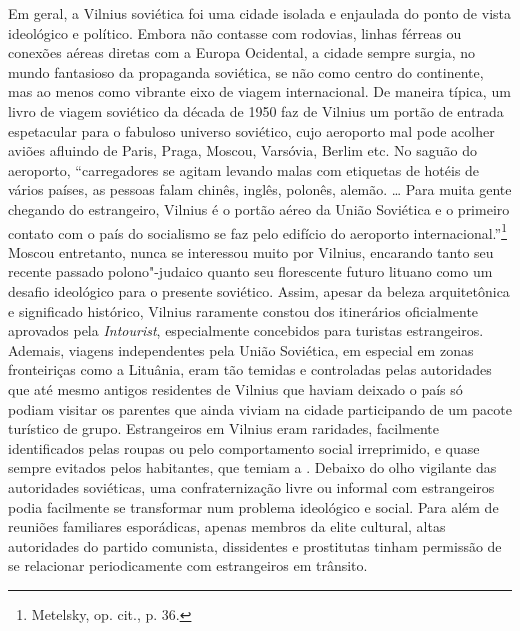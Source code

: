 Em geral, a Vilnius soviética foi uma cidade isolada e enjaulada do
ponto de vista ideológico e político. Embora não contasse com rodovias,
linhas férreas ou conexões aéreas diretas com a Europa Ocidental, a
cidade sempre surgia, no mundo fantasioso da propaganda soviética, se
não como centro do continente, mas ao menos como vibrante eixo de viagem
internacional. De maneira típica, um livro de viagem soviético da década
de 1950 faz de Vilnius um portão de entrada espetacular para o fabuloso
universo soviético, cujo aeroporto mal pode acolher aviões afluindo de
Paris, Praga, Moscou, Varsóvia, Berlim etc. No saguão do aeroporto,
``carregadores se agitam levando malas com etiquetas de hotéis de vários
países, as pessoas falam chinês, inglês, polonês, alemão. \ldots{} Para
muita gente chegando do estrangeiro, Vilnius é o portão aéreo da União
Soviética e o primeiro contato com o país do socialismo se faz pelo
edifício do aeroporto internacional.''\footnote{Metelsky, op. cit., p.
  36.} Moscou entretanto, nunca se interessou muito por Vilnius,
encarando tanto seu recente passado polono"-judaico quanto seu
florescente futuro lituano como um desafio ideológico para o presente
soviético. Assim, apesar da beleza arquitetônica e significado
histórico, Vilnius raramente constou dos itinerários oficialmente
aprovados pela \emph{Intourist}, especialmente concebidos para turistas
estrangeiros. Ademais, viagens independentes pela União Soviética, em
especial em zonas fronteiriças como a Lituânia, eram tão temidas e
controladas pelas autoridades que até mesmo antigos residentes de
Vilnius que haviam deixado o país só podiam visitar os parentes que
ainda viviam na cidade participando de um pacote turístico de grupo.
Estrangeiros em Vilnius eram raridades, facilmente identificados pelas
roupas ou pelo comportamento social irreprimido, e quase sempre evitados
pelos habitantes, que temiam a . Debaixo do olho vigilante das
autoridades soviéticas, uma confraternização livre ou informal com
estrangeiros podia facilmente se transformar num problema ideológico e
social. Para além de reuniões familiares esporádicas, apenas membros da
elite cultural, altas autoridades do partido comunista, dissidentes e
prostitutas tinham permissão de se relacionar periodicamente com
estrangeiros em trânsito.

